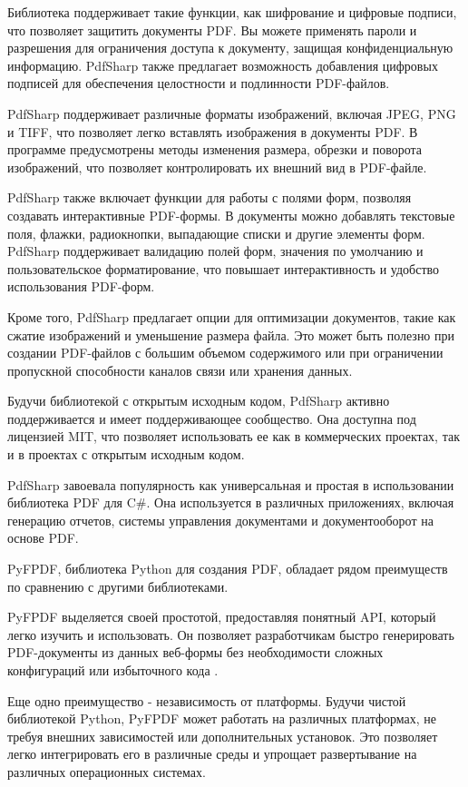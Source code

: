 Библиотека поддерживает такие функции, как шифрование и цифровые подписи, что позволяет защитить документы PDF. Вы можете применять пароли и разрешения для ограничения доступа к документу, защищая конфиденциальную информацию. PdfSharp также предлагает возможность добавления цифровых подписей для обеспечения целостности и подлинности PDF-файлов.

PdfSharp поддерживает различные форматы изображений, включая JPEG, PNG и TIFF, что позволяет легко вставлять изображения в документы PDF. В программе предусмотрены методы изменения размера, обрезки и поворота изображений, что позволяет контролировать их внешний вид в PDF-файле.

PdfSharp также включает функции для работы с полями форм, позволяя создавать интерактивные PDF-формы. В документы можно добавлять текстовые поля, флажки, радиокнопки, выпадающие списки и другие элементы форм. PdfSharp поддерживает валидацию полей форм, значения по умолчанию и пользовательское форматирование, что повышает интерактивность и удобство использования PDF-форм.

Кроме того, PdfSharp предлагает опции для оптимизации документов, такие как сжатие изображений и уменьшение размера файла. Это может быть полезно при создании PDF-файлов с большим объемом содержимого или при ограничении пропускной способности каналов связи или хранения данных.

Будучи библиотекой с открытым исходным кодом, PdfSharp активно поддерживается и имеет поддерживающее сообщество. Она доступна под лицензией MIT, что позволяет использовать ее как в коммерческих проектах, так и в проектах с открытым исходным кодом.

PdfSharp завоевала популярность как универсальная и простая в использовании библиотека PDF для C\#. Она используется в различных приложениях, включая генерацию отчетов, системы управления документами и документооборот на основе PDF.

PyFPDF, библиотека Python для создания PDF, обладает рядом преимуществ по сравнению с другими библиотеками.

PyFPDF выделяется своей простотой, предоставляя понятный API, который легко изучить и использовать. Он позволяет разработчикам быстро генерировать PDF-документы из данных веб-формы без необходимости сложных конфигураций или избыточного кода \cite{fpdf}.

Еще одно преимущество - независимость от платформы. Будучи чистой библиотекой Python, PyFPDF может работать на различных платформах, не требуя внешних зависимостей или дополнительных установок. Это позволяет легко интегрировать его в различные среды и упрощает развертывание на различных операционных системах.

